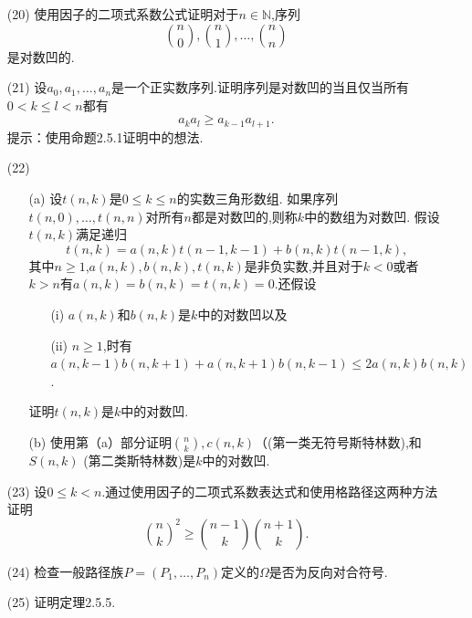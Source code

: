 \documentclass{ctexbook}
\begin{document}
\begin{enumerate}
	\item[(20)]使用因子的二项式系数公式证明对于$n\in\mathbb{N}$,序列
		$$\binom{n}{0},\binom{n}{1},\dots,\binom{n}{n}$$是对数凹的.
\end{enumerate}


\begin{enumerate}
	\item[(21)]设$a_0,a_1,\dots,a_n$是一个正实数序列.证明序列是对数凹的当且仅当所有$0<k\le l<n$都有$$a_ka_l\ge a_{k-1}a_{l+1}.$$
	提示：使用命题2.5.1证明中的想法. 
\end{enumerate}

\begin{enumerate}
	\item[(22)]
	\begin{enumerate}
		\item[(a)] 设$t(n,k)$是$0\le k\le n$的实数三角形数组. 如果序列$t(n,0),\dots,t(n,n)$对所有$n$都是对数凹的,则称$k$中的数组为对数凹. 
		假设$t(n,k)$满足递归
		$$t(n,k)=a(n,k)t(n-1,k-1)+b(n,k)t(n-1,k),$$其中$n\ge1$,$a(n,k),b(n,k),t(n,k)$是非负实数,并且对于$k<0$或者$k>n$有$a(n,k)=b(n,k)=t(n,k)=0$.还假设
		\begin{enumerate}
			\item[(i)]$a(n,k)$和$b(n,k)$是$k$中的对数凹以及
		    \item[(ii)]$n\ge1$,时有$a(n,k-1)b(n,k+1)+a(n,k+1)b(n,k-1)\le 2a(n,k)b(n,k)$. 
		\end{enumerate}
        证明$t(n,k)$是$k$中的对数凹.
        \item[(b)]使用第（a）部分证明$\binom{n}{k},c(n,k)$（(第一类无符号斯特林数),和$S(n,k)$ (第二类斯特林数)是$k$中的对数凹.
     \end{enumerate}
\end{enumerate}

\begin{enumerate}
	\item[(23)]设$0\le k<n$.通过使用因子的二项式系数表达式和使用格路径这两种方法证明
	$${\binom{n}{k}}^2\ge\binom{n-1}{k}\binom{n+1}{k}.
	$$
\end{enumerate}


\begin{enumerate}
	\item[(24)]检查一般路径族$P=(P_1,\dots,P_n)$定义的$\Omega$是否为反向对合符号.
\end{enumerate}	

\begin{enumerate}
	\item[(25)]证明定理2.5.5. 
\end{enumerate}	
\end{document}
